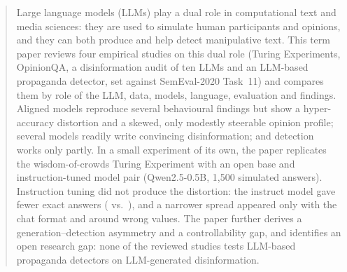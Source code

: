 \documentclass[11pt,a4paper]{article}
\begin{document}
\begin{abstract}
\noindent Large language models (LLMs) play a dual role in computational text and media sciences: they are used to simulate human participants and opinions, and they can both produce and help detect manipulative text. This term paper reviews four empirical studies on this dual role (Turing Experiments, OpinionQA, a disinformation audit of ten LLMs and an LLM-based propaganda detector, set against SemEval-2020 Task~11) and compares them by role of the LLM, data, models, language, evaluation and findings. Aligned models reproduce several behavioural findings but show a hyper-accuracy distortion and a skewed, only modestly steerable opinion profile; several models readily write convincing disinformation; and detection works only partly. In a small experiment of its own, the paper replicates the wisdom-of-crowds Turing Experiment with an open base and instruction-tuned model pair (Qwen2.5-0.5B, 1,500 simulated answers). Instruction tuning did not produce the distortion: the instruct model gave fewer exact answers (\xInstExact{} vs.\ \xBaseExact{}), and a narrower spread appeared only with the chat format and around wrong values. The paper further derives a generation--detection asymmetry and a controllability gap, and identifies an open research gap: none of the reviewed studies tests LLM-based propaganda detectors on LLM-generated disinformation.
\end{abstract}
\newpage
\tableofcontents
\newpage















\newpage




\newpage


\end{document}
